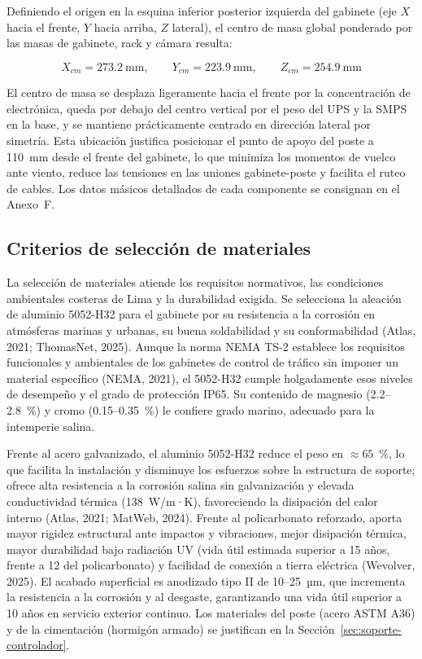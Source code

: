 Definiendo el origen en la esquina inferior posterior izquierda del gabinete (eje $X$ hacia el frente, $Y$ hacia arriba, $Z$ lateral), el centro de masa global ponderado por las masas de gabinete, rack y cámara resulta:

\begin{equation}
X_{cm} = 273.2~\text{mm}, \qquad Y_{cm} = 223.9~\text{mm}, \qquad Z_{cm} = 254.9~\text{mm}
\end{equation}

El centro de masa se desplaza ligeramente hacia el frente por la concentración de electrónica, queda por debajo del centro vertical por el peso del UPS y la SMPS en la base, y se mantiene prácticamente centrado en dirección lateral por simetría. Esta ubicación justifica posicionar el punto de apoyo del poste a 110~mm desde el frente del gabinete, lo que minimiza los momentos de vuelco ante viento, reduce las tensiones en las uniones gabinete-poste y facilita el ruteo de cables. Los datos másicos detallados de cada componente se consignan en el Anexo~F.

\subsection{Criterios de selección de materiales}\label{subsec:seleccion-materiales}

La selección de materiales atiende los requisitos normativos, las condiciones ambientales costeras de Lima y la durabilidad exigida. Se selecciona la aleación de aluminio 5052-H32 para el gabinete por su resistencia a la corrosión en atmósferas marinas y urbanas, su buena soldabilidad y su conformabilidad (Atlas, 2021; ThomasNet, 2025). Aunque la norma NEMA TS-2 establece los requisitos funcionales y ambientales de los gabinetes de control de tráfico sin imponer un material específico (NEMA, 2021), el 5052-H32 cumple holgadamente esos niveles de desempeño y el grado de protección IP65. Su contenido de magnesio (2.2--2.8~\%) y cromo (0.15--0.35~\%) le confiere grado marino, adecuado para la intemperie salina.

Frente al acero galvanizado, el aluminio 5052-H32 reduce el peso en $\approx 65$~\%, lo que facilita la instalación y disminuye los esfuerzos sobre la estructura de soporte; ofrece alta resistencia a la corrosión salina sin galvanización y elevada conductividad térmica (138~W/m·K), favoreciendo la disipación del calor interno (Atlas, 2021; MatWeb, 2024). Frente al policarbonato reforzado, aporta mayor rigidez estructural ante impactos y vibraciones, mejor disipación térmica, mayor durabilidad bajo radiación UV (vida útil estimada superior a 15 años, frente a 12 del policarbonato) y facilidad de conexión a tierra eléctrica (Wevolver, 2025). El acabado superficial es anodizado tipo II de 10--25~µm, que incrementa la resistencia a la corrosión y al desgaste, garantizando una vida útil superior a 10 años en servicio exterior continuo. Los materiales del poste (acero ASTM A36) y de la cimentación (hormigón armado) se justifican en la Sección~\ref{sec:soporte-controlador}.

